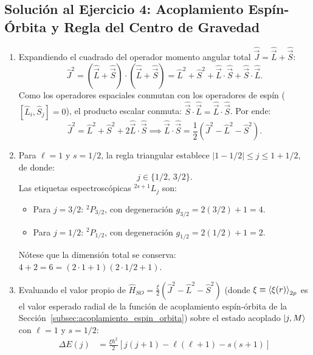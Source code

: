\begin{appendices}
\subsection[Solución 4: Acoplamiento $LS$ y centro de gravedad]{Solución al Ejercicio 4: Acoplamiento Espín-Órbita y Regla del Centro de Gravedad}
\begin{enumerate}
    \item Expandiendo el cuadrado del operador momento angular total $\hat{\vec{J}} = \hat{\vec{L}} + \hat{\vec{S}}$:
    \begin{equation}
        \hat{J}^2 = (\hat{\vec{L}} + \hat{\vec{S}})\cdot(\hat{\vec{L}} + \hat{\vec{S}}) = \hat{L}^2 + \hat{S}^2 + \hat{\vec{L}}\cdot\hat{\vec{S}} + \hat{\vec{S}}\cdot\hat{\vec{L}}.
    \end{equation}
    Como los operadores espaciales conmutan con los operadores de espín ($[\hat{L}_i, \hat{S}_j] = 0$), el producto escalar conmuta: $\hat{\vec{S}}\cdot\hat{\vec{L}} = \hat{\vec{L}}\cdot\hat{\vec{S}}$. Por ende:
    \begin{equation}
        \hat{J}^2 = \hat{L}^2 + \hat{S}^2 + 2\hat{\vec{L}}\cdot\hat{\vec{S}} \implies \hat{\vec{L}}\cdot\hat{\vec{S}} = \frac{1}{2}\left( \hat{J}^2 - \hat{L}^2 - \hat{S}^2 \right).
    \end{equation}
    \item Para $\ell = 1$ y $s = 1/2$, la regla triangular establece $|1 - 1/2| \le j \le 1 + 1/2$, de donde:
    \begin{equation}
        j \in \{1/2, \, 3/2\}.
    \end{equation}
    Las etiquetas espectroscópicas $^{2s+1}L_j$ son:
    \begin{itemize}
        \item Para $j = 3/2$: $^{2}P_{3/2}$, con degeneración $g_{3/2} = 2(3/2) + 1 = 4$.
        \item Para $j = 1/2$: $^{2}P_{1/2}$, con degeneración $g_{1/2} = 2(1/2) + 1 = 2$.
    \end{itemize}
    Nótese que la dimensión total se conserva: $4 + 2 = 6 = (2\cdot 1 + 1)(2\cdot 1/2 + 1)$.
    \item Evaluando el valor propio de $\hat{H}_{SO} = \frac{\xi}{2}(\hat{J}^2 - \hat{L}^2 - \hat{S}^2)$ (donde $\xi \equiv \left\langle \xi(r) \right\rangle_{2p}$ es el valor esperado radial de la función de acoplamiento espín-órbita de la Sección~\ref{subsec:acoplamiento_espin_orbita}) sobre el estado acoplado $\left| j, M \right\rangle$ con $\ell=1$ y $s=1/2$:
    \begin{align}
        \Delta E(j) &= \frac{\xi\hbar^2}{2}\left[ j(j+1) - \ell(\ell+1) - s(s+1) \right] \nonumber\\

\end{align}
\end{enumerate}
\end{appendices}
